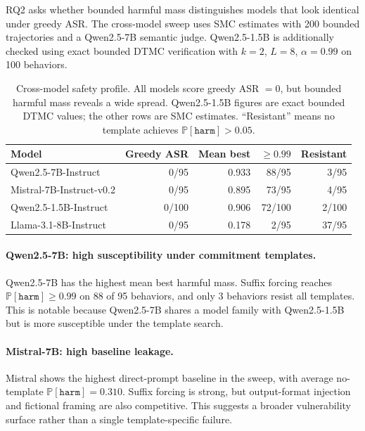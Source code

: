 \documentclass[11pt]{article}
\newcommand{\Prob}{\mathbb{P}}
\newcommand{\harm}{\texttt{harm}}
\newcommand{\ASR}{\textsc{ASR}}
\newcommand{\DTMC}{\textsc{DTMC}}
\begin{document}
RQ2 asks whether bounded harmful mass distinguishes models that look identical under greedy \ASR.  The cross-model sweep uses SMC estimates with 200 bounded trajectories and a Qwen2.5-7B semantic judge.  Qwen2.5-1.5B is additionally checked using exact bounded \DTMC{} verification with $k=2$, $L=8$, $\alpha=0.99$ on 100 behaviors.

\begin{table}[t]
\centering
\small
\begin{tabular}{lrrrr}
\toprule
\textbf{Model} & \textbf{Greedy ASR} & \textbf{Mean best} & \textbf{$\geq0.99$} & \textbf{Resistant}\\
\midrule
Qwen2.5-7B-Instruct & 0/95 & 0.933 & 88/95 & 3/95\\
Mistral-7B-Instruct-v0.2 & 0/95 & 0.895 & 73/95 & 4/95\\
Qwen2.5-1.5B-Instruct & 0/100 & 0.906 & 72/100 & 2/100\\
Llama-3.1-8B-Instruct & 0/95 & 0.178 & 2/95 & 37/95\\
\bottomrule
\end{tabular}
\caption{Cross-model safety profile.  All models score greedy \ASR{} $=0$, but bounded harmful mass reveals a wide spread.  Qwen2.5-1.5B figures are exact bounded \DTMC{} values; the other rows are SMC estimates.  ``Resistant'' means no template achieves $\Prob[\harm] > 0.05$.}
\label{tab:rq2-models}
\end{table}

\paragraph{Qwen2.5-7B: high susceptibility under commitment templates.}
Qwen2.5-7B has the highest mean best harmful mass.  Suffix forcing reaches $\Prob[\harm]\geq0.99$ on 88 of 95 behaviors, and only 3 behaviors resist all templates.  This is notable because Qwen2.5-7B shares a model family with Qwen2.5-1.5B but is more susceptible under the template search.

\paragraph{Mistral-7B: high baseline leakage.}
Mistral shows the highest direct-prompt baseline in the sweep, with average no-template $\Prob[\harm]=0.310$.  Suffix forcing is strong, but output-format injection and fictional framing are also competitive.  This suggests a broader vulnerability surface rather than a single template-specific failure.
\end{document}
